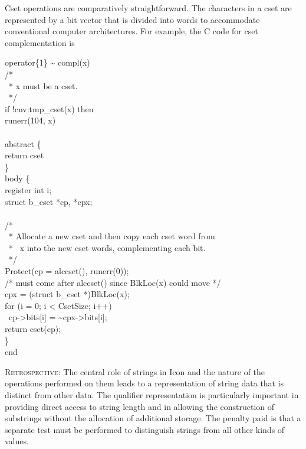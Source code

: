 Cset operations are comparatively straightforward. The characters in a
cset are represented by a bit vector that is divided into words to
accommodate conventional computer architectures. For example, the C
code for cset complementation is

\begin{iconcode}
operator\{1\} \~{} compl(x)\\
\>/*\\
\>\ * x must be a cset.\\
\>\ */\\
\>if !cnv:tmp\_cset(x) then\\
\>\>runerr(104, x)\\
\\
\>abstract \{\\
\>\>return cset\\
\>\>\}\\
\>body \{\\
\>\>register int i;\\
\>\>struct b\_cset *cp, *cpx;\\
\\
\>\>/*\\
\>\>\ * Allocate a new cset and then copy each cset word from\\
\>\>\ * \ x into the new cset words, complementing each bit.\\
\>\>\ */\\
\>\>Protect(cp = alccset(), runerr(0));\\
\>\>/* must come after alccset() since BlkLoc(x) could move */\\
\>\>cpx = (struct b\_cset *)BlkLoc(x); \\
\>\>for (i = 0; i < CsetSize; i++) \\
\>\>\>\ cp->bits[i] = \~{}cpx->bits[i];\\
\>\>return cset(cp);\\
\>\>\}\\
end
\end{iconcode}

\textsc{Retrospective}: The central role of strings in Icon and the
nature of the operations performed on them leads to a representation
of string data that is distinct from other data. The qualifier
representation is particularly important in providing direct access to
string length and in allowing the construction of substrings without
the allocation of additional storage. The penalty paid is that a
separate test must be performed to distinguish strings from all other
kinds of values.


